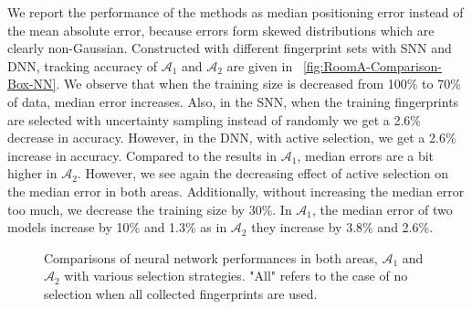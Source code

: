 \documentclass{article}
\begin{document}
	We report the performance of the methods as median positioning error instead of the mean absolute error, because errors form skewed distributions which are clearly non-Gaussian. Constructed with different fingerprint sets with SNN and DNN, tracking accuracy of $\mathcal{A}_1$ and $\mathcal{A}_2$ are given in \figurename~\ref{fig:RoomA-Comparison-Box-NN}. We observe that when the training size is decreased from 100\% to 70\% of data, median error increases. Also, in the SNN, when the training fingerprints are selected with uncertainty sampling instead of randomly we get a 2.6\% decrease in accuracy. However, in the DNN, with active selection, we get a 2.6\% increase in accuracy. Compared to the results in $\mathcal{A}_1$, median errors are a bit higher in $\mathcal{A}_2$. However, we see again the decreasing effect of active selection on the median error in both areas. Additionally, without increasing the median error too much, we decrease the training size by 30\%. In $\mathcal{A}_1$, the median error of two models increase by 10\% and 1.3\% as in $\mathcal{A}_2$ they increase by 3.8\% and 2.6\%.
	\begin{figure}[h]                                                 
		\caption{Comparisons of neural network performances in both areas, $\mathcal{A}_1$ and $\mathcal{A}_2$ with various selection strategies. "All" refers to the case of no selection when all collected fingerprints are used.}
	\end{figure}
	
\end{document}
